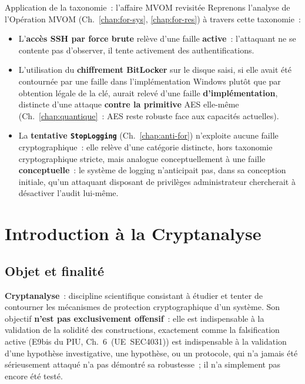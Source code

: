 \begin{boxscenario}{Application de la taxonomie~: l'affaire MVOM
revisitée}
Reprenons l'analyse de l'Opération MVOM (Ch.~\ref{chap:for-sys},
\ref{chap:for-res}) à travers cette taxonomie~:

\begin{itemize}
    \item L'\textbf{accès SSH par force brute} relève d'une faille
          \textbf{active}~: l'attaquant ne se contente pas
          d'observer, il tente activement des authentifications.
    \item L'utilisation du \textbf{chiffrement BitLocker} sur le
          disque saisi, si elle avait été contournée par une faille
          dans l'implémentation Windows plutôt que par obtention
          légale de la clé, aurait relevé d'une faille
          \textbf{d'implémentation}, distincte d'une attaque
          \textbf{contre la primitive} AES elle-même
          (Ch.~\ref{chap:quantique}~: AES reste robuste face aux
          capacités actuelles).
    \item La \textbf{tentative \texttt{StopLogging}}
          (Ch.~\ref{chap:anti-for}) n'exploite aucune faille
          cryptographique~: elle relève d'une catégorie distincte,
          hors taxonomie cryptographique stricte, mais analogue
          conceptuellement à une faille \textbf{conceptuelle}~: le
          système de logging n'anticipait pas, dans sa conception
          initiale, qu'un attaquant disposant de privilèges
          administrateur chercherait à désactiver l'audit
          lui-même.
\end{itemize}
\end{boxscenario}

\section{Introduction à la Cryptanalyse}
\label{sec:intro-cryptanalyse}

\subsection{Objet et finalité}

\begin{boxdef}
\textbf{Cryptanalyse}~: discipline scientifique consistant à
étudier et tenter de contourner les mécanismes de protection
cryptographique d'un système. Son objectif \textbf{n'est pas
exclusivement offensif}~: elle est indispensable à la validation
de la solidité des constructions, exactement comme la falsification
active (E9bis du PIU, Ch.~6~(UE~SEC4031)) est indispensable à la
validation d'une hypothèse investigative, une hypothèse, ou un
protocole, qui n'a jamais été sérieusement attaqué n'a pas démontré
sa robustesse~; il n'a simplement pas encore été testé.
\end{boxdef}

